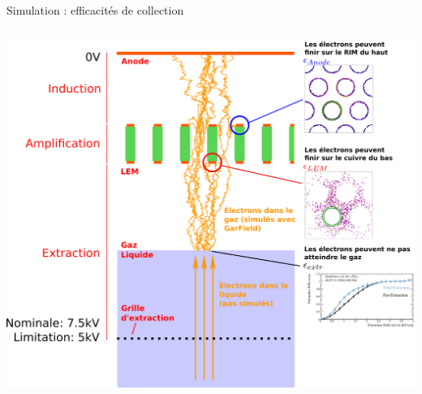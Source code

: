\begin{frame}{Simulation : efficacités de collection}
\begin{scriptsize}
\begin{columns}
\begin{column}{0.65\textwidth}
	    			\includegraphics[width=1.18\textwidth]{./pictures/coll_proba_2.png}\\
	    		\end{column}
	    	\end{columns}
    	\end{scriptsize} 
    \end{frame}
    
